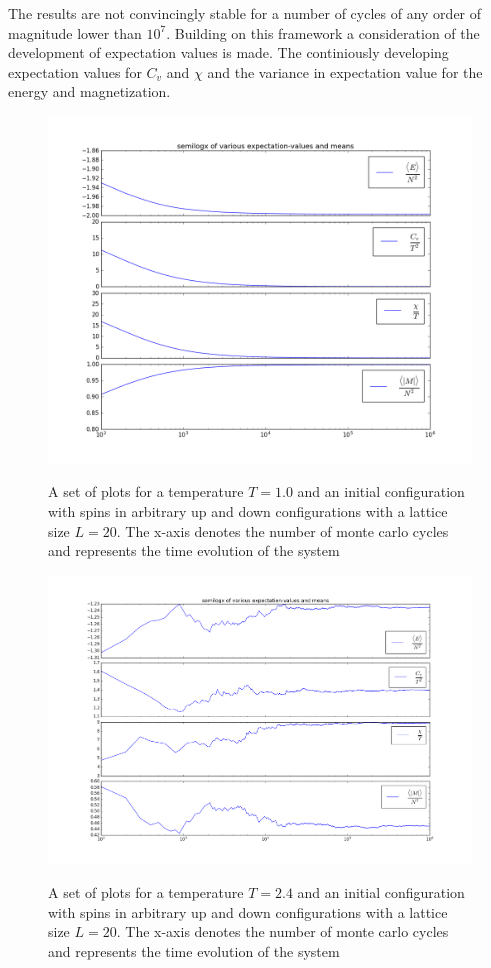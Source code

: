 \documentclass[12pt]{article}
\begin{document}
\noindent The results are not convincingly stable for a number of cycles of any order of magnitude lower than $10^7$. Building on this framework a consideration of the development of expectation values is made. The continiously developing expectation values for  $C_v$ and $\chi$  and the variance in expectation value for the energy and magnetization.

\begin{figure}
\hspace*{-2cm}\includegraphics[scale=0.5]{exp_vals.png}\label{fig:exp_t1}
\caption{A set of plots for a temperature $T = 1.0$ and an initial configuration with spins in arbitrary up and down configurations with a lattice size $L = 20$. The x-axis denotes the number of monte carlo cycles and represents the time evolution of the system}
\end{figure}

\begin{figure}
\hspace*{-4cm}\includegraphics[scale=0.5]{exp_vals_2.png}\label{fig:exp_t2}
\caption{A set of plots for a temperature $T = 2.4$ and an initial configuration with spins in arbitrary up and down configurations with a lattice size $L = 20$. The x-axis denotes the number of monte carlo cycles and represents the time evolution of the system}
\end{figure}
\end{document}
